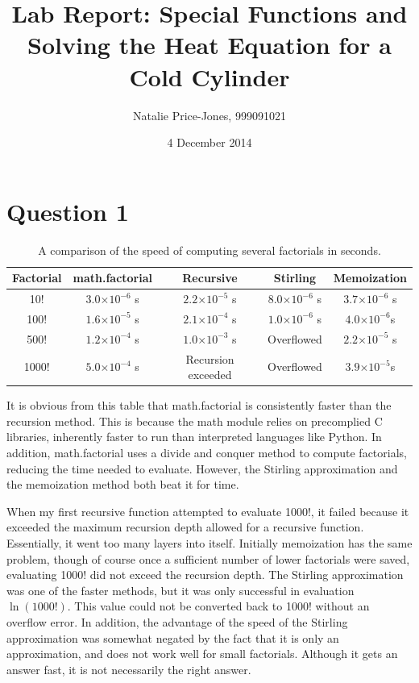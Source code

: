 \documentclass[a4paper,12pt]{article}
\providecommand{\e}[1]{\ensuremath{\times 10^{#1}}}
\begin{document}
\title{Lab Report: Special Functions and Solving the Heat Equation for a Cold Cylinder}
\author{Natalie Price-Jones, 999091021}
\date{4 December 2014}
\maketitle

\section{Question 1}
\begin{table}[H]
  \centering
  \begin{tabular}{|c||c||c||c||c|}
    \hline
    Factorial & math.factorial & Recursive & Stirling & Memoization\\
    \hline
    \hline
    10! & $3.0\e{-6}$ s & $2.2\e{-5}$ s & $8.0\e{-6}$ s & $3.7\e{-6}$ s\\
    \hline
    100! & $1.6\e{-5}$ s & $2.1\e{-4}$ s& $1.0\e{-6}$ s& $4.0\e{-6}$s\\
    \hline
    500! & $1.2\e{-4}$ s& $1.0\e{-3}$ s& Overflowed & $2.2\e{-5}$ s\\
    \hline
    1000! & $5.0\e{-4}$ s& Recursion exceeded & Overflowed & $3.9\e{-5}$s\\
    \hline
  \end{tabular}
  \caption{A comparison of the speed of computing several factorials in seconds.}
\end{table}

It is obvious from this table that math.factorial is consistently faster than the recursion method. This is because the math module relies on precomplied C libraries, inherently faster to run than interpreted languages like Python. In addition, math.factorial uses a divide and conquer method to compute factorials, reducing the time needed to evaluate. However, the Stirling approximation and the memoization method both beat it for time.

When my first recursive function attempted to evaluate 1000!, it failed because it exceeded the maximum recursion depth allowed for a recursive function. Essentially, it went too many layers into itself. Initially memoization has the same problem, though of course once a sufficient number of lower factorials were saved, evaluating 1000! did not exceed the recursion depth. The Stirling approximation was one of the faster methods, but it was only successful in evaluation $\ln(1000!)$. This value could not be converted back to 1000! without an overflow error. In addition, the advantage of the speed of the Stirling approximation was somewhat negated by the fact that it is only an approximation, and does not work well for small factorials. Although it gets an answer fast, it is not necessarily the right answer.
\end{document}
